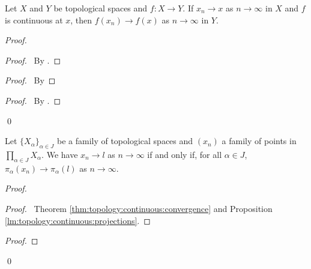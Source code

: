 \begin{thm}
  \label{thm:topology:continuous:convergence}
  Let $X$ and $Y$ be topological spaces and $f : X \rightarrow Y$.
  If $x_n \rightarrow x$ as $n \rightarrow \infty$ in $X$ and $f$ is
  continuous
  at $x$, then $f(x_n)
  \rightarrow f(x)$ as $n \rightarrow \infty$ in $Y$.
\end{thm}

\begin{proof}
  \pf
  \begin{proof}
    \pf\ By .
  \end{proof}
  \begin{proof}
    \pf\ By 
  \end{proof}
  \begin{proof}
    \pf\ By .
  \end{proof}
  \qed
\end{proof}

\begin{cor}
  \label{cor:topology:continuous:product_converge}
  Let $\{ X_\alpha \}_{\alpha \in J}$ be a family of topological spaces and $(x_n)$ a family of points in $\prod_{\alpha \in J} X_\alpha$. We have $x_n \rightarrow l$ as $n \rightarrow \infty$ if and only if, for all $\alpha \in J$, $\pi_\alpha(x_n) \rightarrow \pi_\alpha(l)$ as $n \rightarrow \infty$.
\end{cor}

\begin{proof}
  \pf
  \begin{proof}
    \pf\ Theorem \ref{thm:topology:continuous:convergence} and Proposition \ref{lm:topology:continuous:projections}.
  \end{proof}
  \begin{proof}
  \end{proof}
  \qed
\end{proof}

